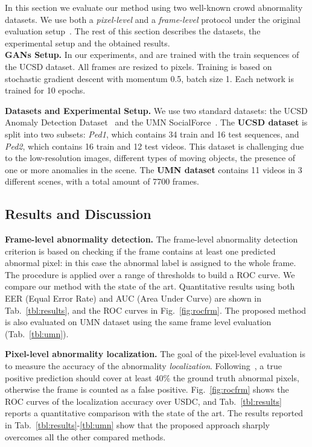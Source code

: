 \documentclass{article}
\begin{document}
	In this section we evaluate our method using two well-known crowd abnormality datasets. We use both a {\em pixel-level} and a {\em frame-level} protocol under the original evaluation setup~\cite{li2014anomaly}. The rest of this section describes the datasets, the experimental setup and the obtained results.\\
	\noindent\textbf{GANs Setup.}
	In our experiments,  and  are trained with the train sequences of the UCSD dataset. All frames are resized to  pixels. Training is based on stochastic gradient descent with momentum 0.5, batch size 1. Each network is trained for 10 epochs.
	
	\noindent\textbf{Datasets and Experimental Setup.}
	We use two standard datasets: the UCSD Anomaly Detection Dataset~\cite{Mahadevan.anomaly.2010} and the UMN SocialForce~\cite{mehran2009abnormal}. The \textbf{UCSD dataset} is split into two subsets: {\em Ped1}, which contains 34 train and 16 test sequences, and {\em Ped2}, which contains 16 train and 12 test videos. This dataset is challenging due to the low-resolution images, different types of moving objects, the presence of one or more anomalies in the scene. The \textbf{UMN dataset} contains 11 videos in 3 different scenes, with a total amount of 7700 frames. 
\subsection{Results and Discussion}
\noindent\textbf{Frame-level abnormality detection.}
The frame-level abnormality detection criterion is based on checking if the frame contains at least one predicted abnormal pixel: in this case the abnormal label is assigned to the whole frame. The procedure is applied over a range of thresholds to build a ROC curve. We compare our method with the state of the art. Quantitative results using both EER (Equal Error Rate) and AUC (Area Under Curve) are shown in Tab.~\ref{tbl:results}, and the ROC curves in Fig.~\ref{fig:rocfrm}.
	The proposed method is also evaluated on UMN dataset using the same frame level evaluation (Tab.~\ref{tbl:umn}). 

	\noindent\textbf{Pixel-level abnormality localization.}
	The goal of the pixel-level evaluation is to measure the accuracy of the abnormality {\em localization}. Following~\cite{li2014anomaly}, a true positive prediction should cover at least 40\% the ground truth abnormal pixels, otherwise the frame is counted as a false positive. Fig.~\ref{fig:rocfrm} shows the ROC curves of the localization accuracy over USDC, and Tab.~\ref{tbl:results} reports a quantitative comparison with the state of the art. The results reported in Tab.~\ref{tbl:results}-\ref{tbl:umn} show that the proposed approach sharply overcomes all the other compared methods.	
	
\end{document}
